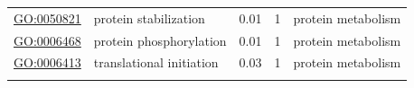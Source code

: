 \documentclass[
]{article}
\begin{document}
\begin{longtable}[]{@{}lllll@{}}
\begin{minipage}[t]{0.17\columnwidth}\raggedright
\url{GO:0050821}\strut
\end{minipage} & \begin{minipage}[t]{0.17\columnwidth}\raggedright
protein stabilization\strut
\end{minipage} & \begin{minipage}[t]{0.17\columnwidth}\raggedright
0.01\strut
\end{minipage} & \begin{minipage}[t]{0.17\columnwidth}\raggedright
1\strut
\end{minipage} & \begin{minipage}[t]{0.17\columnwidth}\raggedright
protein metabolism\strut
\end{minipage}\tabularnewline
\begin{minipage}[t]{0.17\columnwidth}\raggedright
\url{GO:0006468}\strut
\end{minipage} & \begin{minipage}[t]{0.17\columnwidth}\raggedright
protein phosphorylation\strut
\end{minipage} & \begin{minipage}[t]{0.17\columnwidth}\raggedright
0.01\strut
\end{minipage} & \begin{minipage}[t]{0.17\columnwidth}\raggedright
1\strut
\end{minipage} & \begin{minipage}[t]{0.17\columnwidth}\raggedright
protein metabolism\strut
\end{minipage}\tabularnewline
\begin{minipage}[t]{0.17\columnwidth}\raggedright
\url{GO:0006413}\strut
\end{minipage} & \begin{minipage}[t]{0.17\columnwidth}\raggedright
translational initiation\strut
\end{minipage} & \begin{minipage}[t]{0.17\columnwidth}\raggedright
0.03\strut
\end{minipage} & \begin{minipage}[t]{0.17\columnwidth}\raggedright
1\strut
\end{minipage} & \begin{minipage}[t]{0.17\columnwidth}\raggedright
protein metabolism\strut
\end{minipage}\tabularnewline
\begin{minipage}[t]{0.17\columnwidth}\raggedright

\end{minipage}
\end{longtable}
\end{document}

